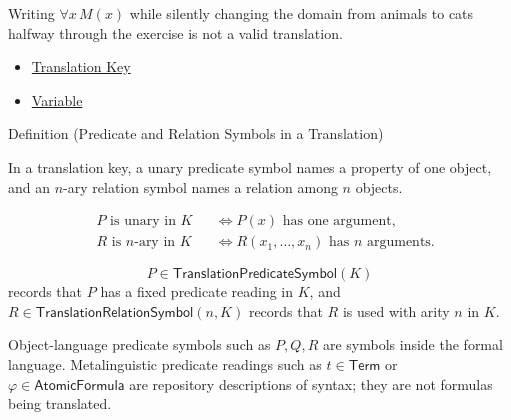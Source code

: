 \begin{remark*}
Writing \(\forall x\,M(x)\) while silently changing the domain from animals to
cats halfway through the exercise is not a valid translation.
\end{remark*}

\begin{dependencies}
\begin{itemize}
  \item \hyperref[def:translation-key-predicate-logic]{Translation Key}
  \item \hyperref[def:variable]{Variable}
\end{itemize}
\end{dependencies}

\begin{definitionbox}{Definition (Predicate and Relation Symbols in a Translation)}
\begin{definition}
\label{def:translation-predicate-relation-symbol}
In a translation key, a unary predicate symbol names a property of one object,
and an \(n\)-ary relation symbol names a relation among \(n\) objects.
\end{definition}
\end{definitionbox}

\begin{remark*}
\[
\begin{aligned}
&P \text{ is unary in }K &&\Longleftrightarrow P(x) \text{ has one argument,}\\
&R \text{ is }n\text{-ary in }K &&\Longleftrightarrow R(x_1,\ldots,x_n)
  \text{ has }n\text{ arguments.}
\end{aligned}
\]
\end{remark*}

\begin{remark*}
\[
  P\in\mathsf{TranslationPredicateSymbol}(K)
\] records that \(P\) has a
fixed predicate reading in \(K\), and \(R\in\mathsf{TranslationRelationSymbol}(n,K)\)
records that \(R\) is used with arity \(n\) in \(K\).
\end{remark*}

\begin{remark*}[Interpretation]
Object-language predicate symbols such as \(P,Q,R\) are symbols inside the
formal language. Metalinguistic predicate readings such as
\(t\in\mathsf{Term}\) or \(\varphi\in\mathsf{AtomicFormula}\) are
repository descriptions of syntax; they are not formulas being translated.
\end{remark*}

